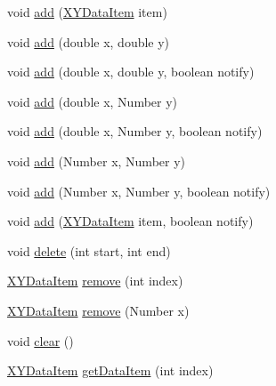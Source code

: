\begin{DoxyCompactItemize}
\item 
void \mbox{\hyperlink{classorg_1_1jfree_1_1data_1_1xy_1_1_x_y_series_a4c3897405e05920b1e78b443ac7462f4}{add}} (\mbox{\hyperlink{classorg_1_1jfree_1_1data_1_1xy_1_1_x_y_data_item}{X\+Y\+Data\+Item}} item)
\item 
void \mbox{\hyperlink{classorg_1_1jfree_1_1data_1_1xy_1_1_x_y_series_a9d25bd65cfa971496ef7eedfc21adf2c}{add}} (double x, double y)
\item 
void \mbox{\hyperlink{classorg_1_1jfree_1_1data_1_1xy_1_1_x_y_series_a188b4e05a97300a0e1a9237244c57f8c}{add}} (double x, double y, boolean notify)
\item 
void \mbox{\hyperlink{classorg_1_1jfree_1_1data_1_1xy_1_1_x_y_series_ad05e8d1b08277921545be2045472c479}{add}} (double x, Number y)
\item 
void \mbox{\hyperlink{classorg_1_1jfree_1_1data_1_1xy_1_1_x_y_series_a967850009f78ba888f4c271674d04b0b}{add}} (double x, Number y, boolean notify)
\item 
void \mbox{\hyperlink{classorg_1_1jfree_1_1data_1_1xy_1_1_x_y_series_a823f46d8a4687120e8aa1a4a4598df54}{add}} (Number x, Number y)
\item 
void \mbox{\hyperlink{classorg_1_1jfree_1_1data_1_1xy_1_1_x_y_series_a56c50773c12d983b5a85aabbd62912c6}{add}} (Number x, Number y, boolean notify)
\item 
void \mbox{\hyperlink{classorg_1_1jfree_1_1data_1_1xy_1_1_x_y_series_a2e5c6d995aca559a3b2cbb4485a9ee3d}{add}} (\mbox{\hyperlink{classorg_1_1jfree_1_1data_1_1xy_1_1_x_y_data_item}{X\+Y\+Data\+Item}} item, boolean notify)
\item 
void \mbox{\hyperlink{classorg_1_1jfree_1_1data_1_1xy_1_1_x_y_series_ae1b054aa1ce3e818f0621364a46f1bd8}{delete}} (int start, int end)
\item 
\mbox{\hyperlink{classorg_1_1jfree_1_1data_1_1xy_1_1_x_y_data_item}{X\+Y\+Data\+Item}} \mbox{\hyperlink{classorg_1_1jfree_1_1data_1_1xy_1_1_x_y_series_a844117c999497a1e5e27f8b005e57535}{remove}} (int index)
\item 
\mbox{\hyperlink{classorg_1_1jfree_1_1data_1_1xy_1_1_x_y_data_item}{X\+Y\+Data\+Item}} \mbox{\hyperlink{classorg_1_1jfree_1_1data_1_1xy_1_1_x_y_series_a5f0fd3114c59bb71752fd3f3e3f13c8e}{remove}} (Number x)
\item 
void \mbox{\hyperlink{classorg_1_1jfree_1_1data_1_1xy_1_1_x_y_series_ab044beb6d6547ebe2e15072b7d6e0df3}{clear}} ()
\item 
\mbox{\hyperlink{classorg_1_1jfree_1_1data_1_1xy_1_1_x_y_data_item}{X\+Y\+Data\+Item}} \mbox{\hyperlink{classorg_1_1jfree_1_1data_1_1xy_1_1_x_y_series_a20c74a3d070152c1b6b50cc4ed0f41c4}{get\+Data\+Item}} (int index)

\end{DoxyCompactItemize}
